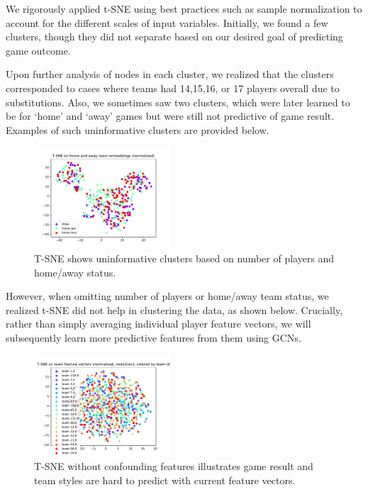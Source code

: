 We rigorously applied t-SNE using best practices such as sample normalization to account for the different scales of input variables. Initially, we found a few clusters, though they did not separate based on our desired goal of predicting game outcome.


Upon further analysis of nodes in each cluster, we realized that the clusters corresponded to cases where teams had 14,15,16, or 17 players overall due to substitutions. Also, we sometimes saw two clusters, which were later learned to be for `home' and `away' games but were still not predictive of game result. Examples of such uninformative clusters are provided below. 

\begin{figure}[h]
  \centering
  \includegraphics[width=0.45\textwidth]{plots/game_NORM_tsne.pdf}
  \caption{T-SNE shows uninformative clusters based on number of players and home/away status.}
\end{figure}


However, when omitting number of players or home/away team status, we realized t-SNE did not help in clustering the data, as shown below. 
Crucially, rather than simply averaging individual player feature vectors, we 
will subsequently learn more predictive features from them using GCNs.


\begin{figure}[h]
  \centering
  \includegraphics[width=0.45\textwidth]{plots/node2vec_NORM_game_team_teamId_tsne.pdf}
  \caption{T-SNE without confounding features illustrates game result and team styles are hard to predict with current feature vectors.}
\end{figure}


